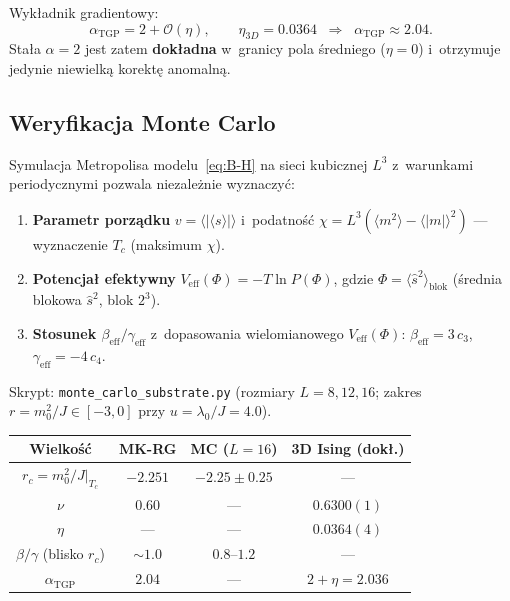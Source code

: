 Wyk\l{}adnik gradientowy:
\begin{equation}\label{eq:B-alpha-eff}
  \alpha_{\mathrm{TGP}} = 2 + \mathcal{O}(\eta), \qquad
  \eta_{3D} = 0.0364 \;\;\Rightarrow\;\;
  \alpha_{\mathrm{TGP}} \approx 2.04.
\end{equation}
Sta\l{}a $\alpha = 2$ jest zatem \textbf{dok\l{}adna}
w~granicy pola \'sredniego ($\eta = 0$) i~otrzymuje
jedynie niewielk\k{a} korekt\k{e} anomaln\k{a}.

\subsection{Weryfikacja Monte Carlo}\label{app:B-MC}

Symulacja Metropolisa modelu~\eqref{eq:B-H} na sieci kubicznej
$L^3$ z~warunkami periodycznymi pozwala niezale\.znie wyznaczy\'c:

\begin{enumerate}[nosep]
  \item \textbf{Parametr porz\k{a}dku} $v = \langle|\langle s\rangle|\rangle$
    i~podatno\'s\'c $\chi = L^3(\langle m^2\rangle - \langle|m|\rangle^2)$
    --- wyznaczenie $T_c$ (maksimum $\chi$).
  \item \textbf{Potencja\l{} efektywny}
    $V_{\mathrm{eff}}(\Phi) = -T\ln P(\Phi)$,
    gdzie $\Phi = \langle\hat{s}^2\rangle_{\mathrm{blok}}$
    (\'srednia blokowa $\hat{s}^2$, blok $2^3$).
  \item \textbf{Stosunek $\beta_{\mathrm{eff}}/\gamma_{\mathrm{eff}}$}
    z~dopasowania wielomianowego $V_{\mathrm{eff}}(\Phi)$:
    $\beta_{\mathrm{eff}} = 3\,c_3$, $\gamma_{\mathrm{eff}} = -4\,c_4$.
\end{enumerate}

Skrypt: \texttt{monte\_carlo\_substrate.py} (rozmiary $L = 8, 12, 16$;
zakres $r = m_0^2/J \in [-3, 0]$ przy $u = \lambda_0/J = 4.0$).

\begin{center}
\small
\begin{tabular}{@{}cccc@{}}
\toprule
\textbf{Wielko\'s\'c} & \textbf{MK-RG} & \textbf{MC ($L{=}16$)} & \textbf{3D Ising (dok\l{}.)} \\
\midrule
$r_c = m_0^2/J|_{T_c}$
  & $-2.251$ & $-2.25 \pm 0.25$ & --- \\
$\nu$
  & $0.60$ & --- & $0.6300(1)$ \\
$\eta$
  & --- & --- & $0.0364(4)$ \\
$\beta/\gamma$ (blisko $r_c$)
  & $\sim 1.0$ & $0.8$--$1.2$ & --- \\
$\alpha_{\mathrm{TGP}}$
  & $2.04$ & --- & $2 + \eta = 2.036$ \\
\bottomrule
\end{tabular}
\end{center}

